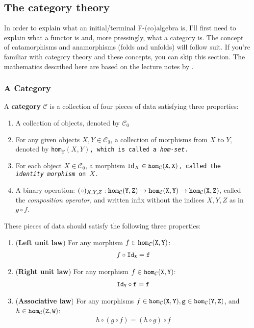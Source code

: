 \subsection{The category theory}\label{sec:cat_theory}
In order to explain what an initial/terminal F-(co)algebra is, I'll first need to explain what a functor is and, more pressingly, what a category is.
The concept of catamorphisms and anamorphisms (folds and unfolds) will follow suit.
If you're familiar with category theory and these concepts, you can skip this section.
The mathematics described here are based on the lecture notes by \cite{Ahrens2022}.

\subsubsection{A Category}
A \textbf{category} $\mathcal{C}$ is a collection of four pieces of data satisfying three properties:
\newcommand{\homm}[2]{\tt{hom}_\mathcal{#1}(#2)}
\begin{enumerate}
    \item A collection of objects, denoted by $\mathcal{C}_0$
    \item For any given objects $X,Y \in \mathcal{C}_0$, a collection of morphisms from $X$ to $Y$, denoted by \tt{hom}$_\mathcal{C}(X,Y)$, which is called a \textit{hom-set}.
    \item For each object $X\in \mathcal{C}_0$, a morphism \tt{Id}$_X\in\homm{C}{X,X}$, called the \textit{identity morphism} on $X$.
    \item A binary operation: $(\circ)_{X,Y,Z}: \homm{C}{Y,Z}\to\homm{C}{X,Y}\to\homm{C}{X,Z}$, called the \textit{composition operator}, and written infix without the indices $X,Y,Z$ as in $g \circ f$.
\end{enumerate}
These pieces of data should satisfy the following three properties:
\begin{enumerate}
    \item (\textbf{Left unit law}) For any morphism $f\in\homm{C}{X,Y}$: \begin{align*} f\circ \tt{Id}_X = f \end{align*}
    \item (\textbf{Right unit law}) For any morphism $f\in\homm{C}{X,Y}$: \begin{align*} \tt{Id}_Y\circ f = f \end{align*}
    \item (\textbf{Associative law}) For any morphisms $f\in\homm{C}{X,Y},g\in\homm{C}{Y,Z}$, and $h\in\homm{C}{Z,W}$: \begin{align*} h\circ(g\circ f)=(h\circ g)\circ f \end{align*}
\end{enumerate}

